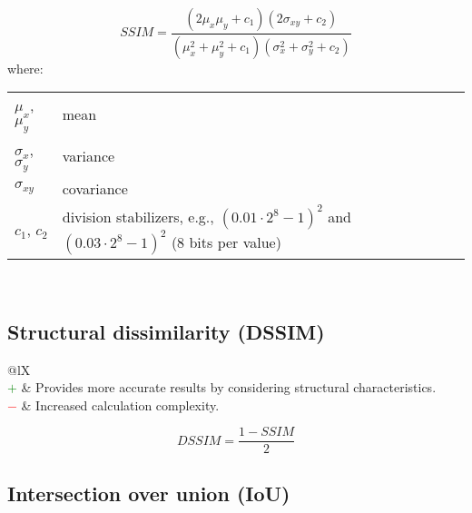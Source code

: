 \documentclass{article}
\makeatletter
\newenvironment{conditions}[1][where:]
	{\hspace{0.02\textwidth} #1 \begin{tabular}[t]{>{$}l<{$} @{${}={}$} l}}
	{\end{tabular}\\[\belowdisplayskip]}
\makeatother
\begin{document}
\begin{equation}
	\textit{SSIM} = \dfrac{(2 \mu_x \mu_y + c_1) (2 \sigma_{xy} + c_2)}{(\mu_x^2 + \mu_y^2 + c_1) (\sigma_x^2 + \sigma_y^2 + c_2)}
%
	\label{equation:SSIM}
\end{equation}
%
\begin{conditions}
	\mu_x$, $\mu_y       & mean       \\
	\sigma_x$, $\sigma_y & variance   \\
	\sigma_{xy}          & covariance \\
	c_1$, $c_2           & division stabilizers, e.g., $(0.01 \cdot 2^8 - 1)^2$ and $(0.03 \cdot 2^8 - 1)^2$ (8 bits per value)
\end{conditions}


\subsection[Structural dissimilarity (DSSIM)]{Structural dissimilarity (DSSIM) \cite{wang2004image, ghodrati2019mr}}

\begin{table}[H]\centering
	\begin{tabularx}{\textwidth}{@{}lX}
		 \\
		\textcolor{Green}{$+$} & Provides more accurate results by considering structural characteristics. \cite{wang2004image} \\
		\textcolor{Red}{$-$}   & Increased calculation complexity.
	\end{tabularx}
\end{table}

\begin{equation}
	\textit{DSSIM} = \dfrac{1 - \textit{SSIM}}{2}
%
	\label{equation:DSSIM}
\end{equation}


\subsection[Intersection over union (IoU)]{Intersection over union (IoU) \cite{jaccard1912distribution, murphy1996finley, rezatofighi2019generalized, zou2023object}}
\end{document}
